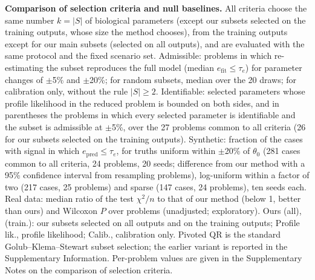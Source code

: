 \documentclass[pdflatex,sn-nature]{sn-jnl}
\theoremstyle{plain}
\begin{document}
\begin{table}[t]
\caption{\textbf{Comparison of selection criteria and null baselines.} All criteria choose the same number $k=|S|$ of biological parameters (except our subsets selected on the training outputs, whose size the method chooses), from the training outputs except for our main subsets (selected on all outputs), and are evaluated with the same protocol and the fixed scenario set. Admissible: problems in which re-estimating the subset reproduces the full model (median $e_{\mathrm{fit}}\le\tau_e$) for parameter changes of $\pm$5\% and $\pm$20\%; for random subsets, median over the 20 draws; for calibration only, without the rule $|S|\ge2$. Identifiable: selected parameters whose profile likelihood in the reduced problem is bounded on both sides, and in parentheses the problems in which every selected parameter is identifiable and the subset is admissible at $\pm$5\%, over the 27 problems common to all criteria (26 for our subsets selected on the training outputs). Synthetic: fraction of the cases with signal in which $e_{\mathrm{pred}}\le\tau_e$, for truths uniform within $\pm$20\% of $\theta_0$ (281 cases common to all criteria, 24 problems, 20 seeds; difference from our method with a 95\% confidence interval from resampling problems), log-uniform within a factor of two (217 cases, 25 problems) and sparse (147 cases, 24 problems), ten seeds each. Real data: median ratio of the test $\chi^2/n$ to that of our method (below 1, better than ours) and Wilcoxon $P$ over problems (unadjusted; exploratory). Ours (all), (train.): our subsets selected on all outputs and on the training outputs; Profile lik., profile likelihood; Calib., calibration only. Pivoted QR is the standard Golub--Klema--Stewart subset selection; the earlier variant is reported in the Supplementary Information. Per-problem values are given in the Supplementary Notes on the comparison of selection criteria.}
\label{tab:comparison}
\centering
\scriptsize
\setlength{\tabcolsep}{1.1pt}

\end{table}
\end{document}
